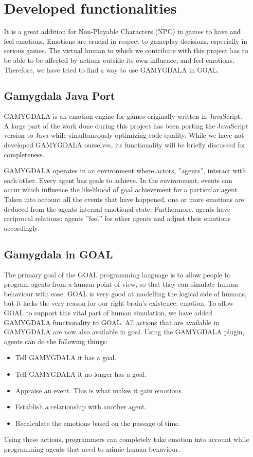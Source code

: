 \section{Developed functionalities}
It is a great addition for Non-Playable Characters (NPC) in games to have and feel emotions. Emotions are crucial in respect to gameplay decisions, especially in serious games. The virtual human to which we contribute with this project has to be able to be affected by actions outside its own influence, and feel emotions. Therefore, we have tried to find a way to use GAMYGDALA \citep{gamygdala} in GOAL.

\subsection{Gamygdala Java Port}
GAMYGDALA is an emotion engine for games originally written in JavaScript. A large part of the work done during this project has been porting the JavaScript version to Java while simultaneously optimizing code quality. While we have not developed GAMYGDALA ourselves, its functionality will be briefly discussed for completeness.

GAMYGDALA operates in an environment where actors, ''agents'', interact with each other. Every agent has goals to achieve. In the environment, events can occur which influence the likelihood of goal achievement for a particular agent. Taken into account all the events that have happened, one or more emotions are deduced from the agents internal emotional state. Furthermore, agents have reciprocal relations: agents ''feel'' for other agents and adjust their emotions accordingly.

\subsection{Gamygdala in GOAL}
The primary goal of the GOAL programming language is to allow people to program agents from a human point of view, so that they can simulate human behaviour with ease. GOAL is very good at modelling the logical side of humans, but it lacks the very reason for our right brain's existence: emotion. To allow GOAL to support this vital part of human simulation, we have added GAMYGDALA functionality to GOAL. All actions that are available in GAMYGDALA are now also available in goal. Using the GAMYGDALA plugin, agents can do the following things:
\begin{itemize}
	\item Tell GAMYGDALA it has a goal.
	\item Tell GAMYGDALA it no longer has a goal.
	\item Appraise an event. This is what makes it gain emotions.
	\item Establish a relationship with another agent.
	\item Recalculate the emotions based on the passage of time.
\end{itemize}
Using these actions, programmers can completely take emotion into account while programming agents that need to mimic human behaviour.